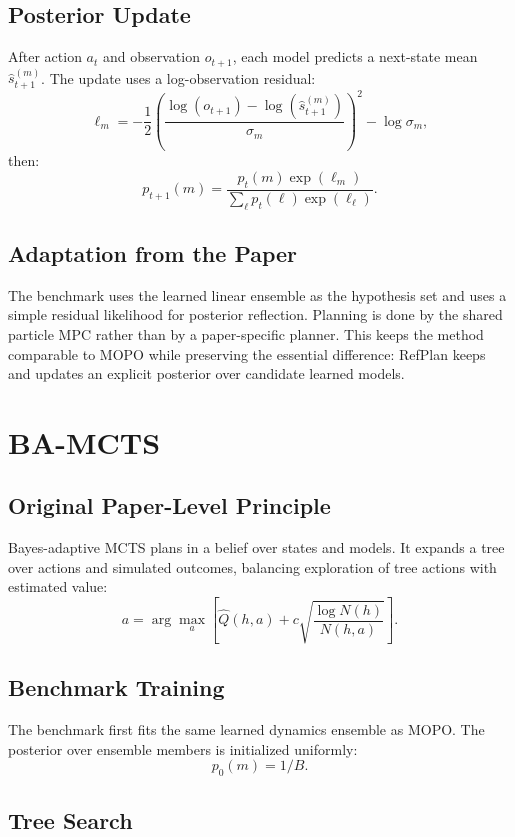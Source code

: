 \documentclass[11pt]{article}
\newcommand{\1}{\mathbf{1}}
\begin{document}
\subsection{Posterior Update}

After action $a_t$ and observation $o_{t+1}$, each model predicts a next-state
mean $\hat{s}_{t+1}^{(m)}$.  The update uses a log-observation residual:
\[
  \ell_m
  =
  -\frac{1}{2}\left(
    \frac{\log(o_{t+1})-\log(\hat{s}_{t+1}^{(m)})}{\sigma_m}
  \right)^2-\log\sigma_m,
\]
then:
\[
  p_{t+1}(m)=
  \frac{p_t(m)\exp(\ell_m)}
       {\sum_\ell p_t(\ell)\exp(\ell_\ell)}.
\]

\subsection{Adaptation from the Paper}

The benchmark uses the learned linear ensemble as the hypothesis set and uses a
simple residual likelihood for posterior reflection.  Planning is done by the
shared particle MPC rather than by a paper-specific planner.  This keeps the
method comparable to MOPO while preserving the essential difference: RefPlan
keeps and updates an explicit posterior over candidate learned models.

\section{BA-MCTS}

\subsection{Original Paper-Level Principle}

Bayes-adaptive MCTS plans in a belief over states and models.  It expands a tree
over actions and simulated outcomes, balancing exploration of tree actions with
estimated value:
\[
  a=\arg\max_a
  \left[
    \hat{Q}(h,a)+c\sqrt{\frac{\log N(h)}{N(h,a)}}
  \right].
\]

\subsection{Benchmark Training}

The benchmark first fits the same learned dynamics ensemble as MOPO.  The
posterior over ensemble members is initialized uniformly:
\[
  p_0(m)=1/B.
\]

\subsection{Tree Search}
\end{document}
